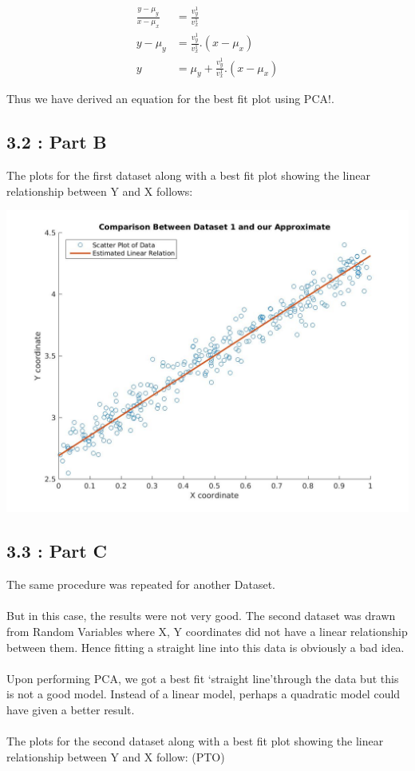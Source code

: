 \documentclass[12pt, a4paper]{article}
\begin{document}
\begin{align*}
\frac{y-\mu_y}{x-\mu_x} &= \frac{v^1_y}{v^1_x}\\
y-\mu_y &= \frac{v^1_y}{v^1_x}.(x-\mu_x) \\
y &= \mu_y + \frac{v^1_y}{v^1_x}.(x-\mu_x)
\end{align*}

Thus we have derived an equation for the best fit plot using PCA!.

\subsection*{3.2 : Part B}
\noindent The plots for the first dataset along with a best fit plot showing the linear relationship between Y and X follows:

\includegraphics[width=\textwidth, height = 0.4\paperheight]{Dataset_1}

\subsection*{3.3 : Part C}
The same procedure was repeated for another Dataset. \\ 
\\ But in this case, the results were not very good. The second dataset was drawn from Random Variables where X, Y coordinates did not have a linear relationship between them. Hence fitting a straight line into this data is obviously a bad idea. 
\\ \\ Upon performing PCA, we got a best fit \lq straight line\rq \space through the data but this is not a good model. Instead of a linear model, perhaps a quadratic model could have given a better result.
\\ \\ \noindent The plots for the second dataset along with a best fit plot showing the linear relationship between Y and X follow: (PTO)
 
\end{document}
